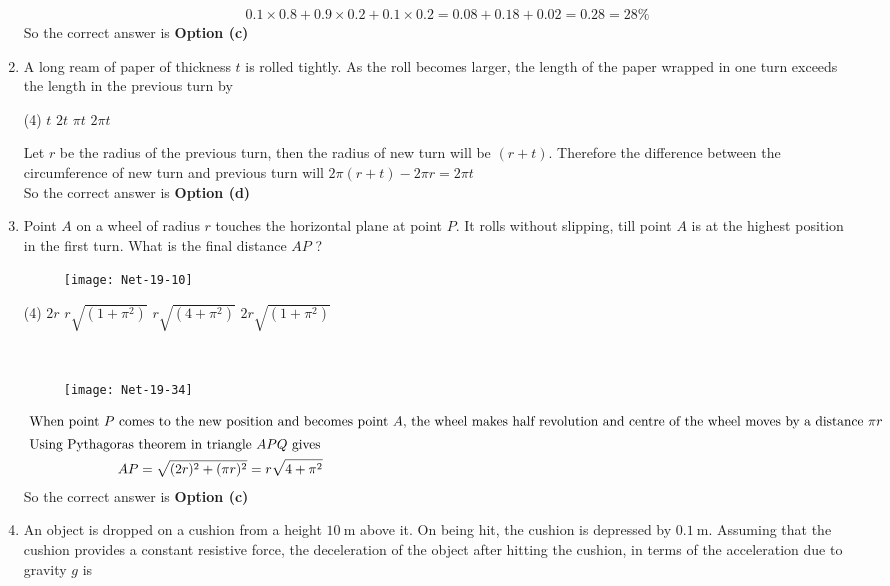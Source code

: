\begin{enumerate}
\begin{answer}
\begin{align*}
&0.1 \times 0.8+0.9 \times 0.2+0.1 \times 0.2=0.08+0.18+0.02=0.28=28 \%
	\end{align*}
		So the correct answer is \textbf{Option (c)}
\end{answer}
\item  A long ream of paper of thickness $t$ is rolled tightly. As the roll becomes larger, the length of the paper wrapped in one turn exceeds the length in the previous turn by
 \begin{tasks}(4)
	\task[\textbf{a.}]$t$
	\task[\textbf{b.}]$2 t$
	\task[\textbf{c.}]$\pi t$
	\task[\textbf{d.}] $2 \pi t$
\end{tasks}
\begin{answer}
 Let $r$ be the radius of the previous turn, then the radius of new turn will be $(r+t)$.
	Therefore the difference between the circumference of new turn and previous turn will $2 \pi(r+t)-2 \pi r=2 \pi t$\\
		So the correct answer is \textbf{Option (d)}
\end{answer}
 \item   Point $A$ on a wheel of radius $r$ touches the horizontal plane at point $P$. It rolls without slipping, till point $A$ is at the highest position in the first turn. What is the final distance $A P$ ?
 \begin{figure}[H]
 	\centering
 	\texttt{[image: Net-19-10]}
 \end{figure}
 \begin{tasks}(4)
	\task[\textbf{a.}]$2 r$
	\task[\textbf{b.}]$r \sqrt{\left(1+\pi^{2}\right)}$
	\task[\textbf{c.}] $r \sqrt{\left(4+\pi^{2}\right)}$
	\task[\textbf{d.}] $2 r \sqrt{\left(1+\pi^{2}\right)}$
\end{tasks}
\begin{answer}$\left. \right. $
	\begin{figure}[H]
		\centering
		\texttt{[image: Net-19-34]}
	\end{figure}
	\begin{align*}
	\intertext{ When point $P$ comes to the new position and becomes point $A$, the wheel makes half revolution and centre of the wheel moves by a distance $\pi r$}
\text{	Using Pythagoras }&\text{theorem in triangle $A P Q$ gives}\\
	A P&=\sqrt{(2 r)^{2}+(\pi r)^{2}}=r \sqrt{4+\pi^{2}}
	\end{align*}
		So the correct answer is \textbf{Option (c)}
\end{answer}
\item  An object is dropped on a cushion from a height $10 \mathrm{~m}$ above it. On being hit, the cushion is depressed by $0.1 \mathrm{~m}$. Assuming that the cushion provides a constant resistive force, the deceleration of the object after hitting the cushion, in terms of the acceleration due to gravity $g$ is

\end{enumerate}
